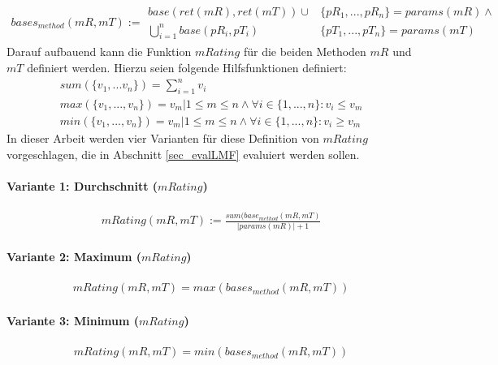 \begin{gather*}
\mathit{bases_{method}(mR,mT)} := \begin{array}{l|l}
\mathit{base(ret(mR), ret(mT))} \cup \mathit{ }
&
\{\mathit{pR_1,...,pR_n}\} = \mathit{params(mR)} \wedge \mathit{ }
\\
\bigcup\limits_{i=1}^{n} \mathit{base(pR_i,pT_i)}
&
\{\mathit{pT_1,...,pT_n}\} = \mathit{params(mT)}
\end{array} 
\end{gather*}
\noindent
Darauf aufbauend kann die Funktion $\mathit{mRating}$ für die beiden Methoden $\mathit{mR}$ und $\mathit{mT}$ definiert werden. Hierzu seien folgende Hilfsfunktionen definiert:
\begin{gather*}
\mathit{sum(\{v_1,...v_n\})} = \sum_{i=1}^{n}v_i
\\
\mathit{max(\{v_1,...,v_n\})} = v_{m}| 1 \leq m \leq n  \wedge \forall i \in  \{1,...,n\}: v_i \leq v_{m}
\\    
\mathit{min(\{v_1,...,v_n\})} = v_{m}| 1 \leq m \leq n  \wedge \forall i \in  \{1,...,n\}: v_i \geq v_{m}   
\end{gather*}
\noindent
In dieser Arbeit werden vier Varianten für diese Definition von $\mathit{mRating}$ vorgeschlagen, die in Abschnitt \ref{sec_evalLMF} evaluiert werden sollen.
\paragraph{Variante 1: Durchschnitt ($\mathit{mRating}$)}

\begin{gather*}
\mathit{mRating(mR,mT)} := \frac{\mathit{sum(base_{method}(mR,mT)}}{|\mathit{params(mR)}|+1}
\end{gather*}

\paragraph{Variante 2: Maximum ($\mathit{mRating}$)}

\begin{gather*}
\mathit{mRating(mR,mT)} = \mathit{max(bases_{method}(mR,mT))}
\end{gather*}

\paragraph{Variante 3: Minimum ($\mathit{mRating}$)}

\begin{gather*}
\mathit{mRating(mR,mT)} = \mathit{min(bases_{method}(mR,mT))}
\end{gather*}

